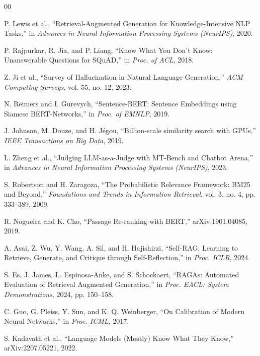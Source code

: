 \documentclass[conference]{IEEEtran}
\begin{document}
\begin{thebibliography}{00}

 P. Lewis et al., ``Retrieval-Augmented Generation for Knowledge-Intensive NLP Tasks,'' in \emph{Advances in Neural Information Processing Systems (NeurIPS)}, 2020.

 P. Rajpurkar, R. Jia, and P. Liang, ``Know What You Don't Know: Unanswerable Questions for SQuAD,'' in \emph{Proc. of ACL}, 2018.

 Z. Ji et al., ``Survey of Hallucination in Natural Language Generation,'' \emph{ACM Computing Surveys}, vol. 55, no. 12, 2023.

 N. Reimers and I. Gurevych, ``Sentence-BERT: Sentence Embeddings using Siamese BERT-Networks,'' in \emph{Proc. of EMNLP}, 2019.

 J. Johnson, M. Douze, and H. J\'egou, ``Billion-scale similarity search with GPUs,'' \emph{IEEE Transactions on Big Data}, 2019.

 L. Zheng et al., ``Judging LLM-as-a-Judge with MT-Bench and Chatbot Arena,'' in \emph{Advances in Neural Information Processing Systems (NeurIPS)}, 2023.

 S. Robertson and H. Zaragoza, ``The Probabilistic Relevance Framework: BM25 and Beyond,'' \emph{Foundations and Trends in Information Retrieval}, vol. 3, no. 4, pp. 333--389, 2009.

 R. Nogueira and K. Cho, ``Passage Re-ranking with BERT,'' arXiv:1901.04085, 2019.

 A. Asai, Z. Wu, Y. Wang, A. Sil, and H. Hajishirzi, ``Self-RAG: Learning to Retrieve, Generate, and Critique through Self-Reflection,'' in \emph{Proc. ICLR}, 2024.

 S. Es, J. James, L. Espinosa-Anke, and S. Schockaert, ``RAGAs: Automated Evaluation of Retrieval Augmented Generation,'' in \emph{Proc. EACL: System Demonstrations}, 2024, pp. 150--158.

 C. Guo, G. Pleiss, Y. Sun, and K. Q. Weinberger, ``On Calibration of Modern Neural Networks,'' in \emph{Proc. ICML}, 2017.

 S. Kadavath et al., ``Language Models (Mostly) Know What They Know,'' arXiv:2207.05221, 2022.

\end{thebibliography}
\end{document}
